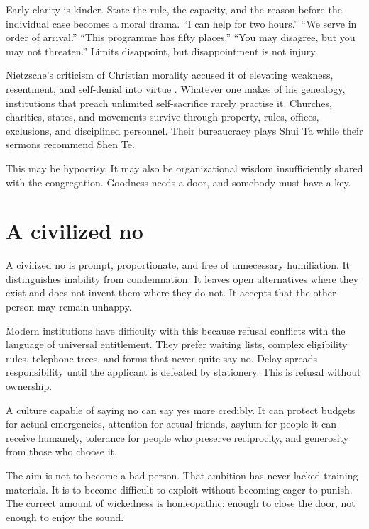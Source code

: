 \documentclass[12pt,a4paper]{book}
\begin{document}
Early clarity is kinder.  State the rule, the capacity, and the reason before
the individual case becomes a moral drama.  ``I can help for two hours.''  ``We
serve in order of arrival.''  ``This programme has fifty places.''  ``You may
disagree, but you may not threaten.''  Limits disappoint, but disappointment
is not injury.

Nietzsche's criticism of Christian morality accused it of elevating weakness,
resentment, and self-denial into virtue \cite[First Essay, \S\S~7--10 and
16]{Nietzsche-GOMaEH}.  Whatever one makes of his genealogy, institutions that
preach unlimited self-sacrifice rarely practise it.  Churches, charities,
states, and movements survive through property, rules, offices, exclusions,
and disciplined personnel.  Their bureaucracy plays Shui Ta while their
sermons recommend Shen Te.

This may be hypocrisy.  It may also be organizational wisdom insufficiently
shared with the congregation.  Goodness needs a door, and somebody must have a
key.

\section{A civilized no}

A civilized no is prompt, proportionate, and free of unnecessary humiliation.
It distinguishes inability from condemnation.  It leaves open alternatives
where they exist and does not invent them where they do not.  It accepts that
the other person may remain unhappy.

Modern institutions have difficulty with this because refusal conflicts with
the language of universal entitlement.  They prefer waiting lists, complex
eligibility rules, telephone trees, and forms that never quite say no.  Delay
spreads responsibility until the applicant is defeated by stationery.  This
is refusal without ownership.

A culture capable of saying no can say yes more credibly.  It can protect
budgets for actual emergencies, attention for actual friends, asylum for people
it can receive humanely, tolerance for people who preserve reciprocity, and
generosity from those who choose it.

The aim is not to become a bad person.  That ambition has never lacked training
materials.  It is to become difficult to exploit without becoming eager to
punish.  The correct amount of wickedness is homeopathic: enough to close the
door, not enough to enjoy the sound.
\end{document}
